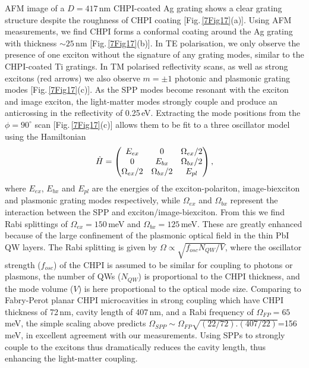 AFM image of a $D=417$\,nm CHPI-coated Ag grating shows a clear grating structure despite the roughness of CHPI coating [Fig.\,\ref{7Fig17}(a)]. Using AFM measurements, we find CHPI forms a conformal coating around the Ag grating with thickness $\sim25$\,nm [Fig.\,\ref{7Fig17}(b)]. In TE polarisation, we only observe the presence of one exciton without the signature of any grating modes, similar to the CHPI-coated Ti gratings. In TM polarised reflectivity scans, as well as strong %
excitons %
(red arrows) we also observe $m=\pm1$ photonic and plasmonic grating modes [Fig.\,\ref{7Fig17}(c)].  As the SPP modes become resonant with the exciton and image exciton, the light-matter modes strongly couple and produce an anticrossing in the reflectivity of 0.25\,eV. Extracting the mode positions from the $\phi=90^{\circ}$ scan [Fig.\,\ref{7Fig17}(c)] allows them to be fit to a three oscillator model using the Hamiltonian
\begin{equation}
\centering 
\hat{H}=\left( \begin{matrix} 
E_{ex} & 0 & \Omega_{ex}/2 \\
0 & E_{bx} & \Omega_{bx}/2 \\
\Omega_{ex}/2 & \Omega_{bx}/2 & E_{pl} 
\end{matrix} \right) ,
\end{equation}
where $E_{ex}$, $E_{bx}$ and $E_{pl}$ are the energies of the exciton-polariton, image-biexciton and plasmonic grating modes respectively, while $\Omega_{ex}$ and $\Omega_{bx}$ represent the interaction between the SPP and exciton/image-biexciton. From this we find Rabi splittings of $\Omega_{ex}=150$\,meV and $\Omega_{bx}=125$\,meV. 
These are greatly enhanced because of the large confinement of the plasmonic optical field in the thin PbI QW layers. The Rabi splitting is given by $\Omega \propto \sqrt{f_{osc} N_{QW}/V}$, where the oscillator strength ($f_{osc}$) of the CHPI is assumed to be similar for coupling to photons or plasmons, the number of QWs ($N_{QW}$) is proportional to the CHPI thickness, and the mode volume ($V$) is here proportional to the optical mode size. Comparing to Fabry-Perot planar CHPI microcavities in strong coupling \cite{Pradeesh2009b} which have CHPI thickness of 72\,nm, cavity length of 407\,nm, and a Rabi frequency of $\Omega_{FP}=65$\,meV, the simple scaling above predicts $\Omega_{SPP} \sim \Omega_{FP} \sqrt{(22/72).(407/22)}$=156\,meV, in excellent agreement with our measurements. Using SPPs to strongly couple to the excitons thus dramatically reduces the cavity length, thus enhancing the light-matter coupling.

